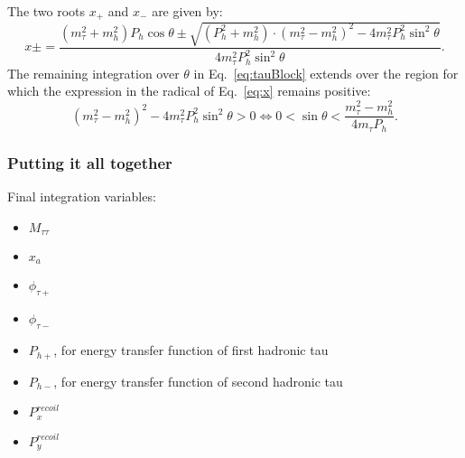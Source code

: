 The two roots $x_{+}$ and $x_{-}$ are given by:
\begin{equation}
x{\pm} = \frac{(m_{\tau}^2 + m_{h}^2) P_{h} \cos\theta \pm \sqrt{(P_{h}^2 + m_{h}^2) \cdot (m_{\tau}^2 - m_{h}^2)^2 - 4 m_{\tau}^2 P_{h}^2 \sin^2\theta}}{4 m_{\tau}^2 P_{h}^2 \sin^2\theta}.
\label{eq:x}
\end{equation}
The remaining integration over $\theta$ in Eq.~\ref{eq:tauBlock} extends over the region for which the expression in the radical of Eq.~\ref{eq:x} remains positive:
\begin{equation*}
(m_{\tau}^2 - m_{h}^2)^2 - 4 m_{\tau}^2 P_{h}^2 \sin^2\theta > 0 \Leftrightarrow 0 < \sin \theta < \frac{m_{\tau}^2 - m_{h}^2}{4 m_{\tau} P_{h}}.
\end{equation*}

\subsubsection{Putting it all together}

Final integration variables:
\begin{itemize}
\item $M_{\tau\tau}$
\item $x_{a}$
\item $\phi_{\tau+}$
\item $\phi_{\tau-}$
\item $P_{h+}$, for energy transfer function of first hadronic tau
\item $P_{h-}$, for energy transfer function of second hadronic tau
\item $P_{x}^{recoil}$
\item $P_{y}^{recoil}$
\end{itemize}

